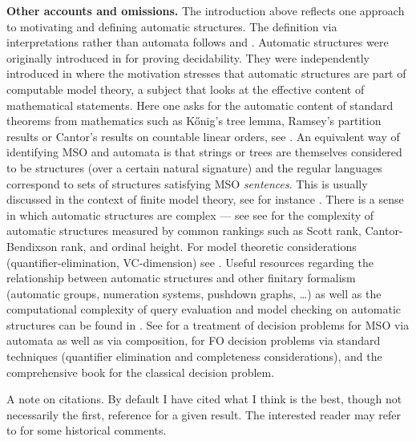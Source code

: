 {\bf Other accounts and omissions.}
The introduction above reflects one approach to motivating and defining automatic structures. The definition via interpretations rather than automata follows \cite{Blum99,BlGr00} and \cite{CoLo07}. 
Automatic structures were originally introduced in \cite{Hodg76,Hodg83} for proving decidability. They were independently introduced in \cite{KhNe95} where the motivation stresses that automatic structures are part of computable model theory, a subject that looks at the effective content of mathematical statements. Here one asks for the automatic content of standard theorems from mathematics such as K\H{o}nig's tree lemma, Ramsey's partition results or Cantor's results on countable linear orders, see \cite{Rubi08,Kusk03,Kusk10,KuLo10}. An equivalent way of identifying MSO and automata is that strings or trees are themselves considered to be structures (over a certain natural signature) and the regular languages correspond to sets of structures satisfying MSO {\em sentences}. This is usually discussed in the context of finite model theory, see for instance \cite{EbFl95}.  There is a sense in which automatic structures are complex --- see  see \cite{KRS05} \cite{KhMi08} for the complexity of automatic structures measured by common rankings such as Scott rank, Cantor-Bendixson rank, and ordinal height. For model theoretic considerations (quantifier-elimination, VC-dimension) see \cite{BLSS03}. Useful resources regarding the relationship between automatic structures and other finitary formalism (automatic groups, numeration systems, pushdown graphs, \dots) as well as the computational complexity of query evaluation and model checking on automatic structures can be found in \cite{BlGr00}  \cite{KuLo09} \cite{BaGrRu11}.  See  \cite{Gure85} for a treatment of decision problems  for MSO via automata as well as via composition, \cite{Rabi77} for FO decision problems via standard techniques  (quantifier elimination and completeness considerations), and the comprehensive book \cite{BGG97} for the classical decision problem. 

A note on citations. By default I have cited what I think is the best, though not necessarily the first, reference for a given result. The interested reader may refer to \cite{Rubi08} for some historical comments.


